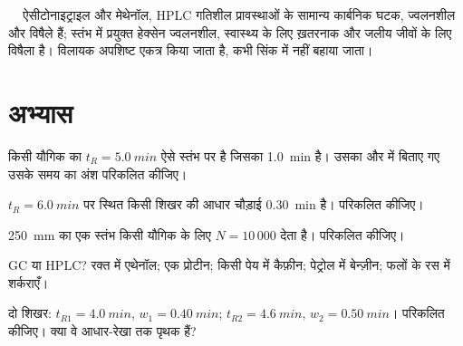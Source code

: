 \begin{safety}{\,\,\,\,\,}
ऐसीटोनाइट्राइल और मेथेनॉल, HPLC गतिशील प्रावस्थाओं के सामान्य कार्बनिक घटक, ज्वलनशील और विषैले हैं;
स्तंभ  में प्रयुक्त हेक्सेन ज्वलनशील, स्वास्थ्य के लिए ख़तरनाक और जलीय जीवों के लिए विषैला है।
विलायक अपशिष्ट एकत्र किया जाता है, कभी सिंक में नहीं बहाया जाता।
\end{safety}

\section{अभ्यास}

\begin{exercise}[$\star$]\label{exo:b2:chromatography:1}
किसी यौगिक का $t_R = \qty{5.0}{min}$ ऐसे स्तंभ पर है जिसका  \qty{1.0}{min} है। उसका
 और  में बिताए गए उसके समय का अंश परिकलित कीजिए।
\end{exercise}

\begin{exercise}[$\star$]\label{exo:b2:chromatography:2}
$t_R = \qty{6.0}{min}$ पर स्थित किसी शिखर की आधार चौड़ाई \qty{0.30}{min} है।  परिकलित कीजिए।
\end{exercise}

\begin{exercise}[$\star$]\label{exo:b2:chromatography:3}
\qty{250}{mm} का एक स्तंभ किसी यौगिक के लिए $N = 10\,000$ देता है।  परिकलित कीजिए।
\end{exercise}

\begin{exercise}[$\star$]\label{exo:b2:chromatography:4}
GC या HPLC? रक्त में एथेनॉल; एक प्रोटीन; किसी पेय में कैफ़ीन; पेट्रोल में बेन्ज़ीन; फलों के रस में शर्कराएँ।
\end{exercise}

\begin{exercise}[$\star\star$]\label{exo:b2:chromatography:5}
दो शिखर: $t_{R1} = \qty{4.0}{min}$, $w_1 = \qty{0.40}{min}$; $t_{R2} = \qty{4.6}{min}$, $w_2 =
\qty{0.50}{min}$।  परिकलित कीजिए। क्या वे आधार-रेखा तक पृथक हैं?
\end{exercise}

